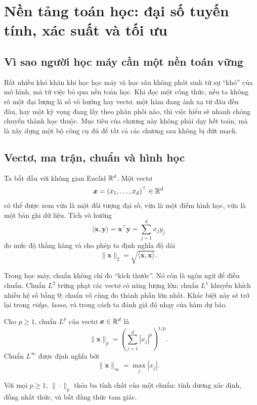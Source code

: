 \chapter{Nền tảng toán học: đại số tuyến tính, xác suất và tối ưu}

\section{Vì sao người học máy cần một nền toán vững}

Rất nhiều khó khăn khi học học máy và học sâu không phát sinh từ sự ``khó'' của mô hình, mà từ việc bỏ qua nền toán học. Khi đọc một công thức, nếu ta không rõ một đại lượng là số vô hướng hay vectơ, một hàm đang ánh xạ từ đâu đến đâu, hay một kỳ vọng đang lấy theo phân phối nào, thì việc hiểu sẽ nhanh chóng chuyển thành học thuộc. Mục tiêu của chương này không phải dạy hết toán, mà là xây dựng một bộ công cụ đủ để tất cả các chương sau không bị đứt mạch.

\section{Vectơ, ma trận, chuẩn và hình học}

Ta bắt đầu với không gian Euclid $\mathbb{R}^d$. Một vectơ
\[
\bm{x} = (x_1,\dots,x_d)^\top \in \mathbb{R}^d
\]
có thể được xem vừa là một đối tượng đại số, vừa là một điểm hình học, vừa là một bản ghi dữ liệu. Tích vô hướng
\[
\langle \bm{x}, \bm{y} \rangle = \bm{x}^\top \bm{y} = \sum_{j=1}^d x_j y_j
\]
đo mức độ thẳng hàng và cho phép ta định nghĩa độ dài
\[
\|\bm{x}\|_2 = \sqrt{\langle \bm{x}, \bm{x} \rangle}.
\]

Trong học máy, chuẩn không chỉ đo ``kích thước''. Nó còn là ngôn ngữ để điều chuẩn. Chuẩn $L^2$ trừng phạt các vectơ có năng lượng lớn; chuẩn $L^1$ khuyến khích nhiều hệ số bằng 0; chuẩn vô cùng đo thành phần lớn nhất. Khác biệt này sẽ trở lại trong \emph{ridge}, \emph{lasso}, và trong cách ta đánh giá độ nhạy của hàm dự báo.

\begin{definition}
Cho $p \ge 1$, chuẩn $L^p$ của vectơ $\bm{x}\in\mathbb{R}^d$ là
\[
\|\bm{x}\|_p = \left(\sum_{j=1}^d |x_j|^p\right)^{1/p}.
\]
Chuẩn $L^\infty$ được định nghĩa bởi
\[
\|\bm{x}\|_\infty = \max_j |x_j|.
\]
\end{definition}

\begin{proposition}
Với mọi $p \ge 1$, \(\|\cdot\|_p\) thỏa ba tính chất của một chuẩn: tính dương xác định, đồng nhất thức, và bất đẳng thức tam giác.
\end{proposition}

